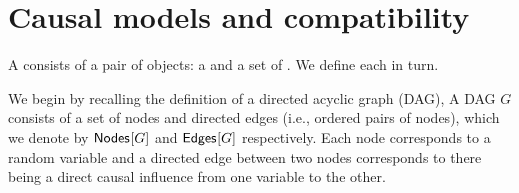 

\section{Causal models and compatibility}\label{sec:definitions}



A  consists of a pair of objects: a  and a set of .  We define each in turn.

We begin by recalling the definition of a directed acyclic graph (DAG),  A DAG $G$ consists of a set of nodes and directed edges (i.e., ordered pairs of nodes), which we denote by ${\operatorname{\mathsf{Nodes}}_{}}\lbrack G\rbrack$ and ${\operatorname{\mathsf{Edges}}_{}}\lbrack G\rbrack$ respectively.  Each node corresponds to a random variable and a directed edge between two nodes corresponds to there being a direct causal influence from one variable to the other.   

